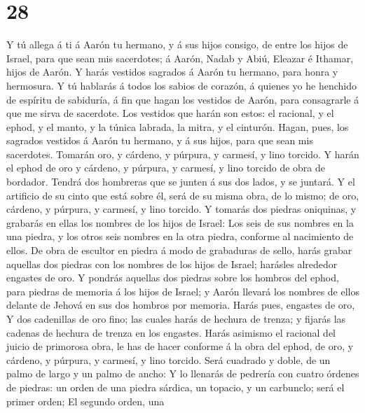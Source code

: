 \hypertarget{section-27}{%
\section{28}\label{section-27}}

 Y tú allega á ti á Aarón tu hermano, y á sus hijos consigo,
de entre los hijos de Israel, para que sean mis sacerdotes; á Aarón,
Nadab y Abiú, Eleazar é Ithamar, hijos de Aarón.  Y harás
vestidos sagrados á Aarón tu hermano, para honra y hermosura.
 Y tú hablarás á todos los sabios de corazón, á quienes yo
he henchido de espíritu de sabiduría, á fin que hagan los vestidos de
Aarón, para consagrarle á que me sirva de sacerdote.  Los
vestidos que harán son estos: el racional, y el ephod, y el manto, y la
túnica labrada, la mitra, y el cinturón. Hagan, pues, los sagrados
vestidos á Aarón tu hermano, y á sus hijos, para que sean mis
sacerdotes.  Tomarán oro, y cárdeno, y púrpura, y carmesí, y
lino torcido.  Y harán el ephod de oro y cárdeno, y púrpura,
y carmesí, y lino torcido de obra de bordador.  Tendrá dos
hombreras que se junten á sus dos lados, y se juntará.  Y el
artificio de su cinto que está sobre él, será de su misma obra, de lo
mismo; de oro, cárdeno, y púrpura, y carmesí, y lino torcido.
 Y tomarás dos piedras oniquinas, y grabarás en ellas los
nombres de los hijos de Israel:  Los seis de sus nombres en
la una piedra, y los otros seis nombres en la otra piedra, conforme al
nacimiento de ellos.  De obra de escultor en piedra á modo
de grabaduras de sello, harás grabar aquellas dos piedras con los
nombres de los hijos de Israel; harásles alrededor engastes de oro.
 Y pondrás aquellas dos piedras sobre los hombros del
ephod, para piedras de memoria á los hijos de Israel; y Aarón llevará
los nombres de ellos delante de Jehová en sus dos hombros por memoria.
 Harás pues, engastes de oro,  Y dos
cadenillas de oro fino; las cuales harás de hechura de trenza; y fijarás
las cadenas de hechura de trenza en los engastes.  Harás
asimismo el racional del juicio de primorosa obra, le has de hacer
conforme á la obra del ephod, de oro, y cárdeno, y púrpura, y carmesí, y
lino torcido.  Será cuadrado y doble, de un palmo de largo
y un palmo de ancho:  Y lo llenarás de pedrería con cuatro
órdenes de piedras: un orden de una piedra sárdica, un topacio, y un
carbunclo; será el primer orden;  El segundo orden, una
